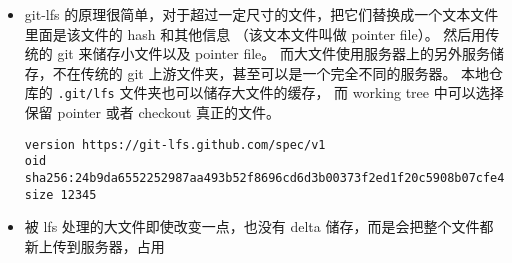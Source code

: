 
\begin{issues}
\issueDraft
\end{issues}

\begin{itemize}
\item git-lfs 的原理很简单，对于超过一定尺寸的文件，把它们替换成一个文本文件里面是该文件的 hash 和其他信息 （该文本文件叫做 pointer file）。 然后用传统的 git 来储存小文件以及 pointer file。 而大文件使用服务器上的另外服务储存，不在传统的 git 上游文件夹，甚至可以是一个完全不同的服务器。 本地仓库的 \verb`.git/lfs` 文件夹也可以储存大文件的缓存， 而 working tree 中可以选择保留 pointer 或者 checkout 真正的文件。
\begin{lstlisting}[language=none,caption=example\_pointer\_file]
version https://git-lfs.github.com/spec/v1
oid sha256:24b9da6552252987aa493b52f8696cd6d3b00373f2ed1f20c5908b07cfe4f2c0
size 12345
\end{lstlisting}
\item 被 lfs 处理的大文件即使改变一点，也没有 delta 储存，而是会把整个文件都新上传到服务器，占用
\end{itemize}
